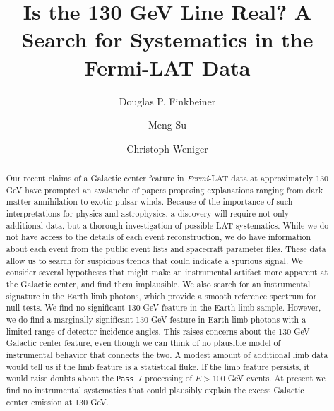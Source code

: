 \documentclass[aps,twocolumn,prd,superscriptaddress,showpacs,nofootinbib,fixfloat]{revtex4}
\newcommand{\Fermi}{{\slshape Fermi}}
\begin{document}
\title{Is the 130 GeV Line Real? 
  A Search for Systematics in the Fermi-LAT Data}

\author{Douglas P. Finkbeiner}

\author{Meng Su}

\author{Christoph Weniger}

\begin{abstract} Our recent claims of a Galactic center
  feature in \Fermi-LAT data at approximately 130 GeV have
  prompted an avalanche of papers proposing explanations
  ranging from dark matter annihilation to exotic pulsar
  winds.  Because of the importance of such interpretations
  for physics and astrophysics, a discovery will require not only additional
  data, but a thorough investigation of possible LAT
  systematics.  While we do not have access to the details
  of each event reconstruction, we do have information about
  each event from the public event lists and spacecraft
  parameter files.  These data allow us to search for
  suspicious trends that could indicate a spurious signal.
  We consider several hypotheses that might make an instrumental
  artifact more apparent at the Galactic center, and find them 
  implausible.  We also search for an instrumental signature in 
  the Earth limb photons, which provide a smooth
  reference spectrum for null tests.  We find no significant 
  130 GeV feature in the Earth limb sample.  However, we do 
  find a marginally significant 130 GeV feature in Earth 
  limb photons with a limited range of detector incidence angles.  
  This raises concerns about
  the 130 GeV Galactic center feature, even though we can
  think of no plausible model of instrumental behavior that
  connects the two.  A modest amount of additional limb data
  would tell us if the limb feature is a statistical fluke.
  If the limb feature persists, it would raise doubts
  about the \texttt{Pass 7} processing of $E > 100$ GeV events.  At present
  we find no instrumental systematics that could plausibly explain the excess
  Galactic center emission at 130 GeV. 
\end{abstract}
\end{document}
